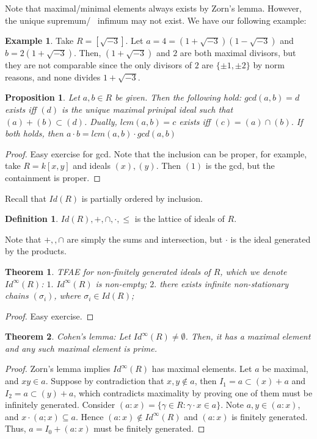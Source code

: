 \documentclass{article}
\newtheorem{theorem}{Theorem}[section]
\newtheorem{proposition}{Proposition}[section]
\theoremstyle{definition}
\newtheorem{definition}{Definition}[section]
\theoremstyle{definition}
\newtheorem{example}{Example}[section]
\begin{document}
Note that maximal/minimal elements always exists by Zorn's lemma. However, the unique supremum/ \ infimum may not exist. We have our following example:

\begin{tcolorbox}[colback=yellow!5!white,colframe=yellow!30!white]
\begin{example}
Take $R=[\sqrt{-3}]$. Let $a=4=(1+\sqrt{-3})(1-\sqrt{-3})$ and $b=2(1+\sqrt{-3})$. Then, $(1+\sqrt{-3})$ and $2$ are both maximal divisors, but they are not comparable since the only divisors of $2$ are $\{ \pm 1, \pm 2 \}$ by norm reasons, and none divides $1+\sqrt{-3}$.
\end{example}
\end{tcolorbox}


\begin{tcolorbox}[colback=blue!5!white,colframe=blue!30!white]
\begin{proposition}
    Let $a,b\in R$ be given. Then the following hold: $gcd(a,b)=d$ exists iff $(d)$ is the unique maximal prinipal ideal such that $(a)+(b)\subset (d)$. Dually, $lcm(a,b)=c$ exists iff $(c)=(a)\cap (b)$. If both holds, then $a\cdot b=lcm(a,b)\cdot gcd(a,b)$
\end{proposition}
\end{tcolorbox}

\begin{proof}
    Easy exercise for gcd. Note that the inclusion can be proper, for example, take $R=k[x,y]$ and ideals $(x),(y)$. Then $(1)$ is the gcd, but the containment is proper.
\end{proof}
Recall that $Id(R)$ is partially ordered by inclusion. 
\begin{definition}
    $Id(R), +,\cap,\cdot,\leq$ is the lattice of ideals of $R$.
\end{definition}
Note that $+,,\cap$ are simply the sums and intersection, but $\cdot$ is the ideal generated by the products. 

\begin{theorem}
TFAE for non-finitely generated ideals of $R$, which we denote $Id^{\infty}(R)$: $1.$ $Id^{\infty}(R)$ is non-empty; $2.$ there exists infinite non-stationary chains $(\sigma_i)$, where $\sigma_i\in Id(R)$;
\end{theorem}
\begin{proof}
    Easy exercise.
\end{proof}

\begin{theorem}
Cohen's lemma: Let $Id^{\infty}(R)\neq \emptyset$. Then, it has a maximal element and any such maximal element is prime. 
\end{theorem}
\begin{proof}
    Zorn's lemma implies $Id^{\infty}(R)$ has maximal elements. Let $a$ be maximal, and $xy\in a$. Suppose by contradiction that $x,y\not \in a$, then $I_1=a\subset (x)+a$ and $I_2=a\subset (y)+a$, which contradicts maximality by proving one of them must be infinitely generated. Consider $(a:x)=\{ \gamma\in R:\gamma\cdot x\in a \}$. Note $a,y\in (a:x)$, and $x\cdot(a;x)\subseteq a$. Hence $(a:x)\not \in Id^{\infty}(R)$ and $(a:x)$ is finitely generated. Thus, $a=I_0+(a:x)$ must be finitely generated. 
\end{proof}
\end{document}
